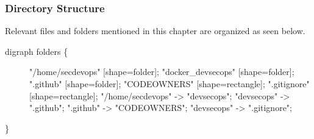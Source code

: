 \clearpage

\hypertarget{directory-structure}{%
\subsubsection{Directory Structure}\label{directory-structure}}

Relevant files and folders mentioned in this chapter are organized as
seen below.

\begin{description}
\item[digraph folders \{]
"/home/secdevops" {[}shape=folder{]}; "docker\_devsecops"
{[}shape=folder{]}; ".github" {[}shape=folder{]}; "CODEOWNERS"
{[}shape=rectangle{]}; ".gitignore" {[}shape=rectangle{]};
"/home/secdevops" -\textgreater{} "devsecops"; "devsecops"
-\textgreater{} ".github"; ".github" -\textgreater{} "CODEOWNERS";
"devsecops" -\textgreater{} ".gitignore";
\end{description}

\}
